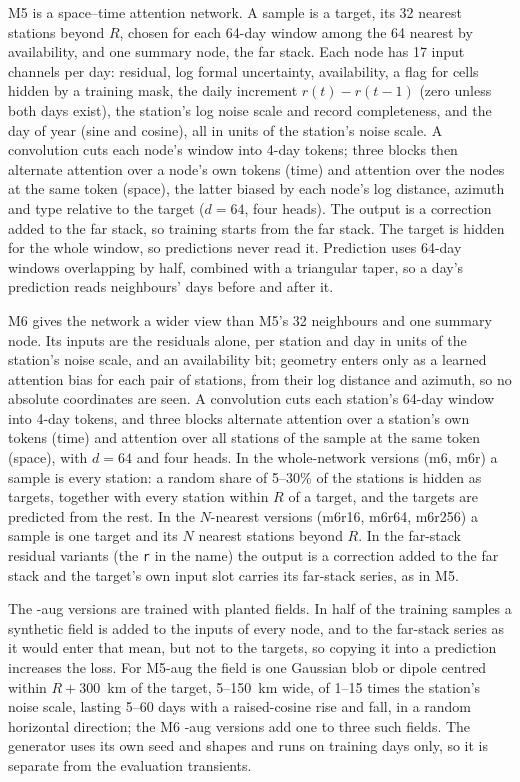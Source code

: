 \documentclass[preprint,12pt,authoryear]{elsarticle}
\begin{document}
M5 is a space--time attention network. A sample is a target, its 32 nearest stations beyond $R$, chosen for each 64-day window among the 64 nearest by availability, and one summary node, the far stack. Each node has 17 input channels per day: residual, log formal uncertainty, availability, a flag for cells hidden by a training mask, the daily increment $r(t) - r(t-1)$ (zero unless both days exist), the station's log noise scale and record completeness, and the day of year (sine and cosine), all in units of the station's noise scale. A convolution cuts each node's window into 4-day tokens; three blocks then alternate attention over a node's own tokens (time) and attention over the nodes at the same token (space), the latter biased by each node's log distance, azimuth and type relative to the target ($d = 64$, four heads). The output is a correction added to the far stack, so training starts from the far stack. The target is hidden for the whole window, so predictions never read it. Prediction uses 64-day windows overlapping by half, combined with a triangular taper, so a day's prediction reads neighbours' days before and after it.

M6 gives the network a wider view than M5's 32 neighbours and one summary node. Its inputs are the residuals alone, per station and day in units of the station's noise scale, and an availability bit; geometry enters only as a learned attention bias for each pair of stations, from their log distance and azimuth, so no absolute coordinates are seen. A convolution cuts each station's 64-day window into 4-day tokens, and three blocks alternate attention over a station's own tokens (time) and attention over all stations of the sample at the same token (space), with $d = 64$ and four heads. In the whole-network versions (m6, m6r) a sample is every station: a random share of 5--30\% of the stations is hidden as targets, together with every station within $R$ of a target, and the targets are predicted from the rest. In the $N$-nearest versions (m6r16, m6r64, m6r256) a sample is one target and its $N$ nearest stations beyond $R$. In the far-stack residual variants (the \texttt{r} in the name) the output is a correction added to the far stack and the target's own input slot carries its far-stack series, as in M5.

The -aug versions are trained with planted fields. In half of the training samples a synthetic field is added to the inputs of every node, and to the far-stack series as it would enter that mean, but not to the targets, so copying it into a prediction increases the loss. For M5-aug the field is one Gaussian blob or dipole centred within $R + 300$~km of the target, 5--150~km wide, of 1--15 times the station's noise scale, lasting 5--60 days with a raised-cosine rise and fall, in a random horizontal direction; the M6 -aug versions add one to three such fields. The generator uses its own seed and shapes and runs on training days only, so it is separate from the evaluation transients.
\end{document}
